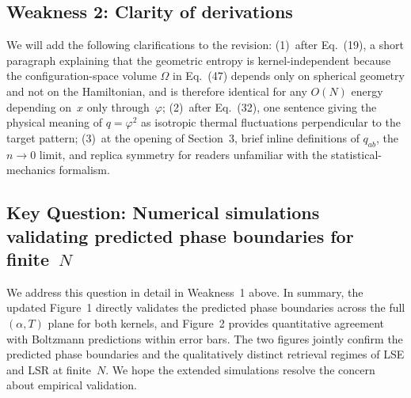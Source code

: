 \documentclass[11pt]{article}
\begin{document}
\subsection*{Weakness 2: Clarity of derivations}

We will add the following clarifications to the revision:
(1)~after Eq.~(19), a short paragraph explaining that the
geometric entropy is kernel-independent because the
configuration-space volume $\Omega$ in Eq.~(47) depends
only on spherical geometry and not on the Hamiltonian,
and is therefore identical for any $O(N)$ energy depending
on~$x$ only through~$\varphi$;
(2)~after Eq.~(32), one sentence giving the physical meaning
of $q=\varphi^2$ as isotropic thermal fluctuations
perpendicular to the target pattern;
(3)~at the opening of Section~3, brief inline definitions of
$q_{ab}$, the $n\to 0$ limit, and replica symmetry for
readers unfamiliar with the statistical-mechanics formalism.

\subsection*{Key Question: Numerical simulations validating
predicted phase boundaries for finite~$N$}

We address this question in detail in Weakness~1 above.
In summary, the updated Figure~1 directly validates the
predicted phase boundaries across the full $(\alpha, T)$
plane for both kernels, and Figure~2 provides quantitative
agreement with Boltzmann predictions within error bars.
The two figures jointly confirm the predicted phase
boundaries and the qualitatively distinct retrieval regimes
of LSE and LSR at finite~$N$. We hope the extended
simulations resolve the concern about empirical validation.
\end{document}
